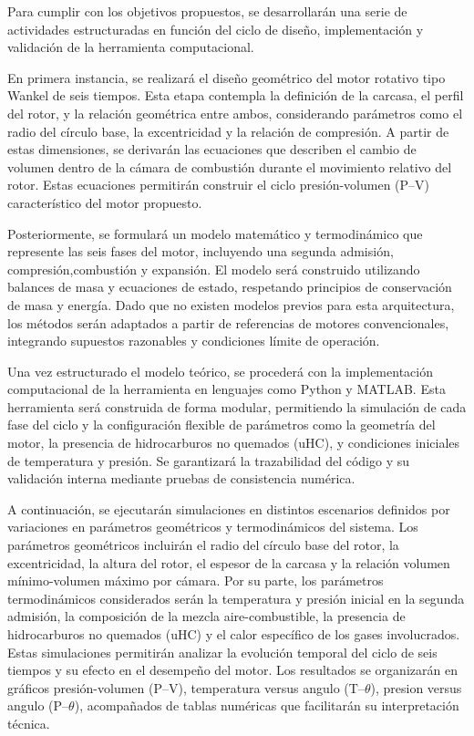 \documentclass{LS}
\begin{document}
Para cumplir con los objetivos propuestos, se desarrollarán una serie de actividades estructuradas en función del ciclo de diseño, implementación y validación de la herramienta computacional.

En primera instancia, se realizará el diseño geométrico del motor rotativo tipo Wankel de seis tiempos. Esta etapa contempla la definición de la carcasa, el perfil del rotor, y la relación geométrica entre ambos, considerando parámetros como el radio del círculo base, la excentricidad y la relación de compresión. A partir de estas dimensiones, se derivarán las ecuaciones que describen el cambio de volumen dentro de la cámara de combustión durante el movimiento relativo del rotor. Estas ecuaciones permitirán construir el ciclo presión-volumen (P–V) característico del motor propuesto.

Posteriormente, se formulará un modelo matemático y termodinámico que represente las seis fases del motor, incluyendo una segunda admisión, compresión,combustión y expansión. El modelo será construido utilizando balances de masa y ecuaciones de estado, respetando principios de conservación de masa y energía. Dado que no existen modelos previos para esta arquitectura, los métodos serán adaptados a partir de referencias de motores convencionales, integrando supuestos razonables y condiciones límite de operación.

Una vez estructurado el modelo teórico, se procederá con la implementación computacional de la herramienta en lenguajes como Python y MATLAB. Esta herramienta será construida de forma modular, permitiendo la simulación de cada fase del ciclo y la configuración flexible de parámetros como la geometría del motor, la presencia de hidrocarburos no quemados (uHC), y condiciones iniciales de temperatura y presión. Se garantizará la trazabilidad del código y su validación interna mediante pruebas de consistencia numérica.

A continuación, se ejecutarán simulaciones en distintos escenarios definidos por variaciones en parámetros geométricos y termodinámicos del sistema. Los parámetros geométricos incluirán el radio del círculo base del rotor, la excentricidad, la altura del rotor, el espesor de la carcasa y la relación volumen mínimo-volumen máximo por cámara. Por su parte, los parámetros termodinámicos considerados serán la temperatura y presión inicial en la segunda admisión, la composición de la mezcla aire-combustible, la presencia de hidrocarburos no quemados (uHC) y el calor específico de los gases involucrados. Estas simulaciones permitirán analizar la evolución temporal del ciclo de seis tiempos y su efecto en el desempeño del motor. Los resultados se organizarán en gráficos presión-volumen (P--V), temperatura versus angulo (T--$\theta$), presion versus angulo (P--$\theta$), acompañados de tablas numéricas que facilitarán su interpretación técnica.
\end{document}
